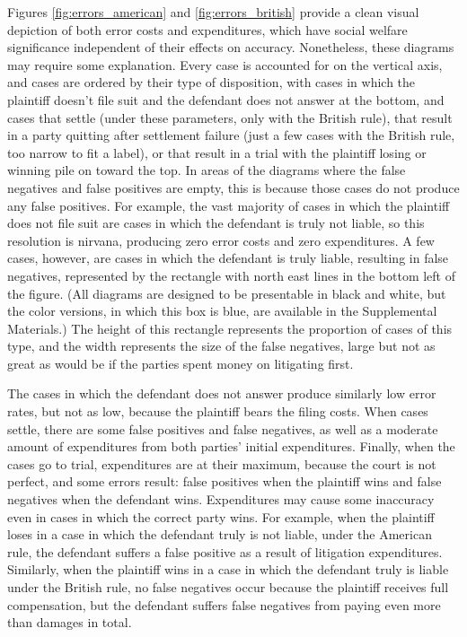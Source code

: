 \documentclass{article}
\begin{document}
Figures \ref{fig:errors_american} and \ref{fig:errors_british} provide a clean visual depiction of both error costs and expenditures, which have social welfare significance independent of their effects on accuracy. Nonetheless, these diagrams may require some explanation. Every case is accounted for on the vertical axis, and cases are ordered by their type of disposition, with cases in which the plaintiff doesn't file suit and the defendant does not answer at the bottom, and cases that settle (under these parameters, only with the British rule), that result in a party quitting after settlement failure (just a few cases with the British rule, too narrow to fit a label), or that result in a trial with the plaintiff losing or winning pile on toward the top. In areas of the diagrams where the false negatives and false positives are empty, this is because those cases do not produce any false positives. For example, the vast majority of cases in which the plaintiff does not file suit are cases in which the defendant is truly not liable, so this resolution is nirvana, producing zero error costs and zero expenditures. A few cases, however, are cases in which the defendant is truly liable, resulting in false negatives, represented by the rectangle with north east lines in the bottom left of the figure. (All diagrams are designed to be presentable in black and white, but the color versions, in which this box is blue, are available in the Supplemental Materials.) The height of this rectangle represents the proportion of cases of this type, and the width represents the size of the false negatives, large but not as great as would be if the parties spent money on litigating first. 

The cases in which the defendant does not answer produce similarly low error rates, but not as low, because the plaintiff bears the filing costs. When cases settle, there are some false positives and false negatives, as well as a moderate amount of expenditures from both parties' initial expenditures. Finally, when the cases go to trial, expenditures are at their maximum, because the court is not perfect, and some errors result: false positives when the plaintiff wins and false negatives when the defendant wins. Expenditures may cause some inaccuracy even in cases in which the correct party wins. For example, when the plaintiff loses in a case in which the defendant truly is not liable, under the American rule, the defendant suffers a false positive as a result of litigation expenditures. Similarly, when the plaintiff wins in a case in which the defendant truly is liable under the British rule, no false negatives occur because the plaintiff receives full compensation, but the defendant suffers false negatives from paying even more than damages in total.
\end{document}
